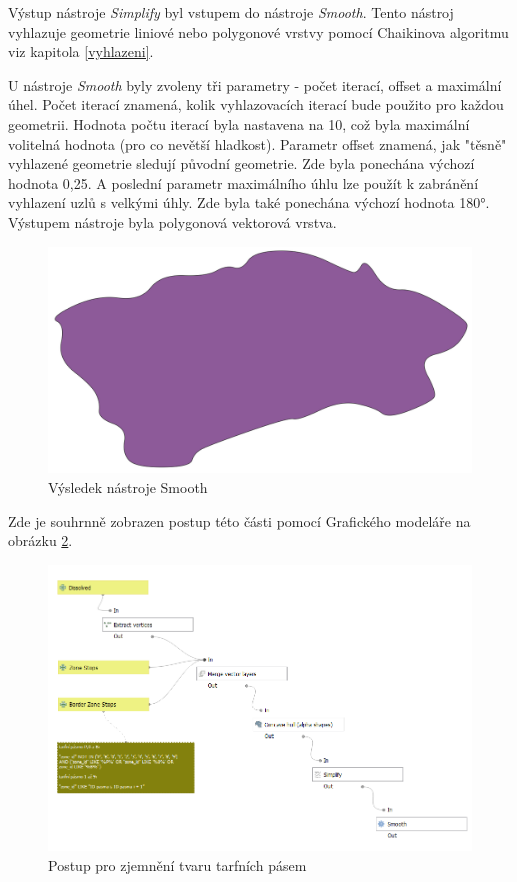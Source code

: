 Výstup nástroje \textit{Simplify} byl vstupem do nástroje \textit{Smooth}. Tento nástroj vyhlazuje geometrie
liniové nebo polygonové vrstvy pomocí Chaikinova algoritmu viz kapitola \ref{vyhlazeni}.

U nástroje \textit{Smooth} byly zvoleny tři parametry - počet iterací, offset a maximální úhel.
Počet iterací znamená, kolik vyhlazovacích iterací bude použito pro každou geometrii.
Hodnota počtu iterací byla nastavena na 10, což byla maximální volitelná hodnota (pro co nevětší hladkost).
Parametr offset znamená, jak "těsně" vyhlazené geometrie sledují původní geometrie.
Zde byla ponechána výchozí hodnota 0,25. A poslední parametr maximálního úhlu lze použít
k zabránění vyhlazení uzlů s velkými úhly. Zde byla také ponechána výchozí hodnota 180°.
Výstupem nástroje byla polygonová vektorová vrstva.

\begin{figure}[H] \centering
    \includegraphics[width=400pt]{./pictures/smooth-P0B.png}
    \caption[Výsledek nástroje Smooth]{Výsledek nástroje Smooth}
	\label{fig:smooth-P0B}                                
\end{figure}

Zde je souhrnně zobrazen postup této části pomocí Grafického modeláře na obrázku \ref{fig:postup-smooth}.

\begin{figure}[H] \centering
    \includegraphics[width=400pt]{./pictures/postup-smooth.png}
    \caption[Postup pro zjemnění tvaru tarfních pásem]{Postup pro zjemnění tvaru tarfních pásem}
	\label{fig:postup-smooth}              
\end{figure}

